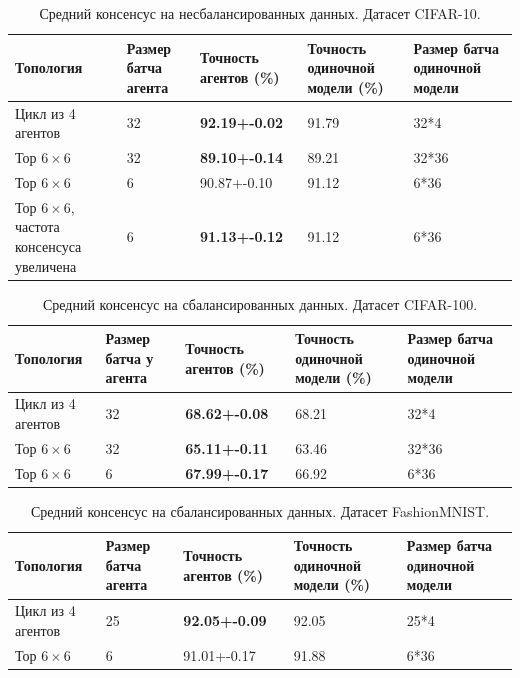 \documentclass[a4paper,article,14pt]{extarticle}
\begin{document}
\begin{center}
    \begin{longtable}{|p{5cm}|p{2cm}|p{3cm}|p{3cm}|p{2cm}|}
    \caption{Средний консенсус на несбалансированных данных. Датасет CIFAR-10.}
    \label{table:tab2}\\
    \hline
    \textbf{Топология} & \textbf{Размер батча агента} & \textbf{Точность агентов (\%)} & \textbf{Точность одиночной модели (\%)} & \textbf{Размер батча одиночной модели}\\
    \hline
    Цикл из 4 агентов & 32 & \textbf{92.19+-0.02} & 91.79 & 32*4\\
    \hline
    Тор $6\times 6$ & 32 & \textbf{89.10+-0.14} & 89.21 & 32*36\\
    \hline
    Тор $6\times 6$ & 6 & 90.87+-0.10 & 91.12 & 6*36\\
    \hline
    Тор $6\times 6$, частота консенсуса увеличена& 6 & \textbf{91.13+-0.12} & 91.12 & 6*36\\
    \hline
    \end{longtable}
\end{center}


\begin{center}
    \begin{longtable}{|p{5cm}|p{2cm}|p{3cm}|p{3cm}|p{2cm}|}
    \caption{Средний консенсус на сбалансированных данных. Датасет CIFAR-100.}
    \label{table:cifar100}\\
    \hline
    \textbf{Топология} & \textbf{Размер батча у агента} & \textbf{Точность агентов (\%)} & \textbf{Точность одиночной модели (\%)} & \textbf{Размер батча одиночной модели}\\
    \hline
    Цикл из 4 агентов & 32 & \textbf{68.62+-0.08} & 68.21 & 32*4\\
    \hline
    Тор $6\times 6$ & 32 & \textbf{65.11+-0.11} & 63.46 & 32*36\\
    \hline
    Тор $6\times 6$ & 6 & \textbf{67.99+-0.17} & 66.92 & 6*36\\
    \hline
    \end{longtable}
\end{center}

\begin{center}
    \begin{longtable}{|p{5cm}|p{2cm}|p{3cm}|p{3cm}|p{2cm}|}
    \caption{Средний консенсус на сбалансированных данных. Датасет FashionMNIST.}
    \label{table:mnist}\\
    \hline
    \textbf{Топология} & \textbf{Размер батча агента} & \textbf{Точность агентов (\%)} & \textbf{Точность одиночной модели (\%)} & \textbf{Размер батча одиночной модели}\\
    \hline
    Цикл из 4 агентов& 25 & \textbf{92.05+-0.09} & 92.05 & 25*4\\
    \hline
    Тор $6\times 6$& 6 & 91.01+-0.17 & 91.88 & 6*36\\
    \hline
    \end{longtable}
\end{center}
\end{document}
